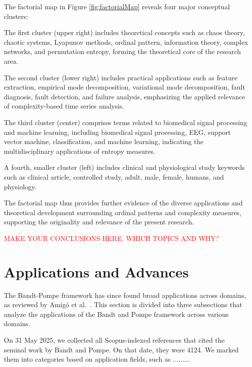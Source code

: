 The factorial map in Figure \ref{fig:factorialMap} reveals four major conceptual clusters:

The first cluster (upper right) includes theoretical concepts such as chaos theory, chaotic systems, Lyapunov methods, ordinal pattern, information theory, complex networks, and permutation entropy, forming the theoretical core of the research area.

The second cluster (lower right) includes practical applications such as feature extraction, empirical mode decomposition, variational mode decomposition, fault diagnosis, fault detection, and failure analysis, emphasizing the applied relevance of complexity-based time series analysis.

The third cluster (center) comprises terms related to biomedical signal processing and machine learning, including biomedical signal processing, EEG, support vector machine, classification, and machine learning, indicating the multidisciplinary applications of entropy measures.

A fourth, smaller cluster (left) includes clinical and physiological study keywords such as clinical article, controlled study, adult, male, female, humans, and physiology.

The factorial map thus provides further evidence of the diverse applications and theoretical development surrounding ordinal patterns and complexity measures, supporting the originality and relevance of the present research.

\textcolor{red}{MAKE YOUR CONCLUSIONS HERE. WHICH TOPICS AND WHY?}

\section{Applications and Advances}


The Bandt-Pompe framework has since found broad applications across domains, as reviewed by Amigó et al.~\cite{amigo2023ordinal}. 
This section is divided into three subsections that analyze the applications of the Bandt and Pompe framework across various domains.

On 31 May 2025, we collected all Scopus-indexed references that cited the seminal work by Bandt and Pompe.
On that date, they were 4124.
We marked them into categories based on application fields, such as .........


